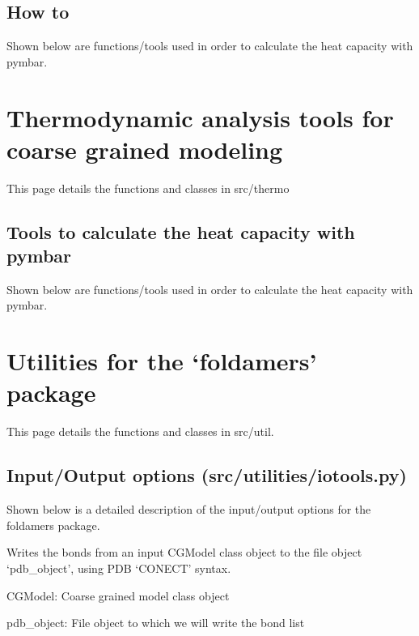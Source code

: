 \documentclass[letterpaper,12pt,english,openany,oneside]{sphinxmanual}
\begin{document}
\section{How to}
\label{\detokenize{parameters:how-to}}
Shown below are functions/tools used in order to calculate
the heat capacity with pymbar.


\chapter{Thermodynamic analysis tools for coarse grained modeling}
\label{\detokenize{thermo:thermodynamic-analysis-tools-for-coarse-grained-modeling}}\label{\detokenize{thermo::doc}}
This page details the functions and classes in src/thermo


\section{Tools to calculate the heat capacity with pymbar}
\label{\detokenize{thermo:tools-to-calculate-the-heat-capacity-with-pymbar}}
Shown below are functions/tools used in order to calculate
the heat capacity with pymbar.


\chapter{Utilities for the ‘foldamers’ package}
\label{\detokenize{utilities:utilities-for-the-foldamers-package}}\label{\detokenize{utilities::doc}}
This page details the functions and classes in src/util.


\section{Input/Output options (src/utilities/iotools.py)}
\label{\detokenize{utilities:input-output-options-src-utilities-iotools-py}}
Shown below is a detailed description of the input/output
options for the foldamers package.

\label{\detokenize{utilities:module-utilities.iotools}}

\begin{fulllineitems}
\label{\detokenize{utilities:utilities.iotools.write_bonds}}
Writes the bonds from an input CGModel class object to the file object ‘pdb\_object’, using PDB ‘CONECT’ syntax.

CGModel: Coarse grained model class object

pdb\_object: File object to which we will write the bond list

\end{fulllineitems}
\end{document}
